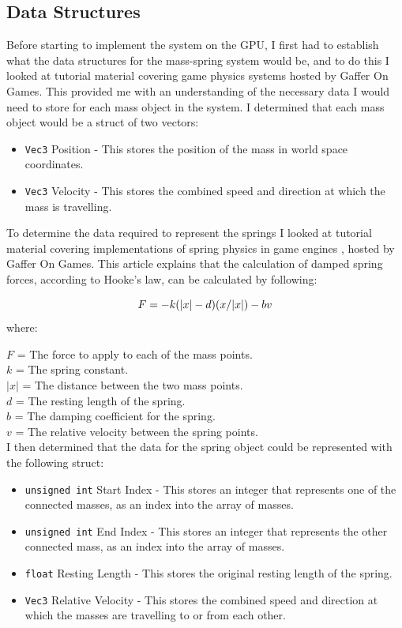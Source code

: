 \documentclass[]{acmsiggraph}
\begin{document}
\subsection{Data Structures}

Before starting to implement the system on the GPU, I first had to establish what the data structures for the mass-spring system would be, and to do this I looked at tutorial material covering game physics systems \cite{gafferPhys} hosted by Gaffer On Games. This provided me with an understanding of the necessary data I would need to store for each mass object in the system. I determined that each mass object would be a struct of two vectors:

\begin{itemize}
	\item \lstinline{Vec3} Position - This stores the position of the mass in world space coordinates.
	\item \lstinline{Vec3} Velocity - This stores the combined speed and direction at which the mass is travelling.
\end{itemize}

To determine the data required to represent the springs I looked at tutorial material covering implementations of spring physics in game engines \cite{gafferSpring}, hosted by Gaffer On Games. This article explains that the calculation of damped spring forces, according to Hooke's law, can be calculated by following:

\begin{equation}
	F = -k(|x|-d)(x/|x|) - bv \\
\end{equation}
where:

$F$ = The force to apply to each of the mass points. \\
$k$ = The spring constant. \\
$|x|$ = The distance between the two mass points. \\
$d$ = The resting length of the spring. \\
$b$ = The damping coefficient for the spring. \\
$v$ = The relative velocity between the spring points. \\
I then determined that the data for the spring object could be represented with the following struct:
\begin{itemize}
	\item \lstinline{unsigned int} Start Index - This stores an integer that represents one of the connected masses, as an index into the array of masses.
	\item \lstinline{unsigned int} End Index - This stores an integer that represents the other connected mass, as an index into the array of masses.
	\item \lstinline{float} Resting Length - This stores the original resting length of the spring.
	\item \lstinline{Vec3} Relative Velocity - This stores the combined speed and direction at which the masses are travelling to or from each other.
\end{itemize}
\end{document}
